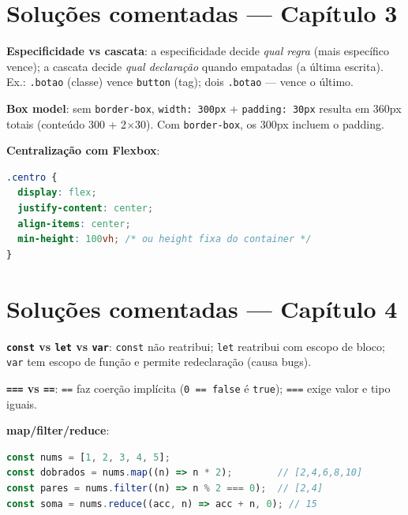 \section{Soluções comentadas — Capítulo 3}

\begin{exercicios}
  \item \textbf{Especificidade vs cascata}: a especificidade decide \emph{qual
  regra} (mais específico vence); a cascata decide \emph{qual declaração}
  quando empatadas (a última escrita). Ex.: \texttt{.botao} (classe) vence
  \texttt{button} (tag); dois \texttt{.botao} — vence o último.
  \item \textbf{Box model}: sem \texttt{border-box}, \texttt{width: 300px} +
  \texttt{padding: 30px} resulta em 360px totais (conteúdo 300 + 2$\times$30).
  Com \texttt{border-box}, os 300px incluem o padding.
  \item \textbf{Centralização com Flexbox}:
\end{exercicios}

\begin{lstlisting}[style=livro, language=CSS, caption={Solução: centralização perfeita.}, label={list:sol-flex}]
.centro {
  display: flex;
  justify-content: center;
  align-items: center;
  min-height: 100vh; /* ou height fixa do container */
}
\end{lstlisting}

\section{Soluções comentadas — Capítulo 4}

\begin{exercicios}
  \item \textbf{\texttt{const} vs \texttt{let} vs \texttt{var}}:
  \texttt{const} não reatribui; \texttt{let} reatribui com escopo de bloco;
  \texttt{var} tem escopo de função e permite redeclaração (causa bugs).
  \item \textbf{\texttt{===} vs \texttt{==}}: \texttt{==} faz coerção implícita
  (\texttt{0 == false} é \texttt{true}); \texttt{===} exige valor e tipo iguais.
  \item \textbf{map/filter/reduce}:
\end{exercicios}

\begin{lstlisting}[style=livro, language=JavaScript, caption={Solução: map/filter/reduce.}, label={list:sol-map}]
const nums = [1, 2, 3, 4, 5];
const dobrados = nums.map((n) => n * 2);        // [2,4,6,8,10]
const pares = nums.filter((n) => n % 2 === 0);  // [2,4]
const soma = nums.reduce((acc, n) => acc + n, 0); // 15
\end{lstlisting}


